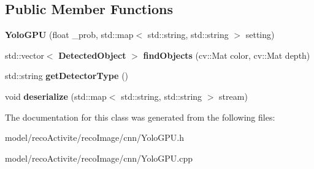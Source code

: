 \subsection*{Public Member Functions}
\begin{DoxyCompactItemize}
\item 
\mbox{\label{class_yolo_g_p_u_a64a5bed90f906a31b6b63eb1efca8024}} 
{\bfseries Yolo\+G\+PU} (float \+\_\+prob, std\+::map$<$ std\+::string, std\+::string $>$ setting)
\item 
\mbox{\label{class_yolo_g_p_u_af6542f94980b65ed5adcfee54256cee9}} 
std\+::vector$<$ \textbf{ Detected\+Object} $>$ {\bfseries find\+Objects} (cv\+::\+Mat color, cv\+::\+Mat depth)
\item 
\mbox{\label{class_yolo_g_p_u_a567132c86a6e9be7e1103cecbceb7915}} 
std\+::string {\bfseries get\+Detector\+Type} ()
\item 
\mbox{\label{class_yolo_g_p_u_adb678816bd5a47b6ad8b2461a358d5fe}} 
void {\bfseries deserialize} (std\+::map$<$ std\+::string, std\+::string $>$ stream)
\end{DoxyCompactItemize}


The documentation for this class was generated from the following files\+:\begin{DoxyCompactItemize}
\item 
model/reco\+Activite/reco\+Image/cnn/Yolo\+G\+P\+U.\+h\item 
model/reco\+Activite/reco\+Image/cnn/Yolo\+G\+P\+U.\+cpp\end{DoxyCompactItemize}

